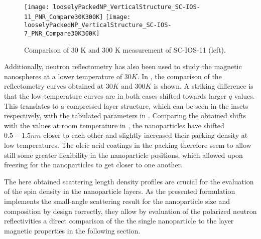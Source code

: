 \documentclass[\main/dresen_thesis.tex]{subfiles}
\begin{document}
  \begin{figure}[tb]
    \centering
    \texttt{[image: looselyPackedNP\_VerticalStructure\_SC-IOS-11\_PNR\_Compare30K300K]}
    \texttt{[image: looselyPackedNP\_VerticalStructure\_SC-IOS-7\_PNR\_Compare30K300K]}
    \caption{\label{fig:looselyPackedNP:layer:pnrCompare30K300K}Comparison of 30 K and 300 K measurement of SC-IOS-11 (left).}
  \end{figure}
  Additionally, neutron reflectometry has also been used to study the magnetic nanospheres at a lower temperature of $30 \unit{K}$.
  In , the comparison of the reflectometry curves obtained at $30 \unit{K}$ and $300 \unit{K}$ is shown.
  A striking difference is that the low-temperature curves are in both cases shifted towards larger $q$ values.
  This translates to a compressed layer structure, which can be seen in the insets respectively, with the tabulated parameters in .
  Comparing the obtained shifts with the values at room temperature in , the nanoparticles have shifted $0.5 - 1.5 \unit{nm}$ closer to each other and slightly increased their packing density at low temperatures.
  The oleic acid coatings in the packing therefore seem to allow still some greater flexibility in the nanoparticle positions, which allowed upon freezing for the nanoparticles to get closer to one another.

  The here obtained scattering length density profiles are crucial for the evaluation of the spin density in the nanoparticle layers.
  As the presented formulation implements the small-angle scattering result for the nanoparticle size and composition by design correctly, they allow by evaluation of the polarized neutron reflectivities a direct comparison of the the single nanoparticle to the layer magnetic properties in the following section.
\end{document}
